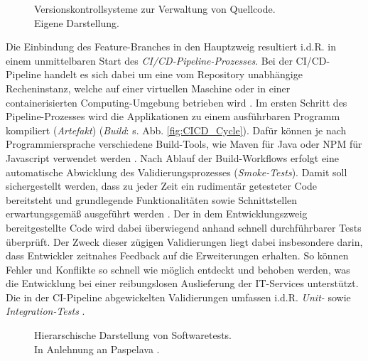 \begin{center}
	\begin{figure}[H]
		\centering
		\caption[Versionskontrollsysteme zur Verwaltung von Quellcode]{Versionskontrollsysteme zur Verwaltung von Quellcode.\\ Eigene Darstellung.}
		\label{fig:VCS}
	\end{figure}
\end{center}
\vspace*{-10mm}
Die Einbindung des Feature-Branches in den Hauptzweig resultiert i.d.R. in einem unmittelbaren Start des \textit{CI/CD-Pipeline-Prozesses}. Bei der CI/CD-Pipeline handelt es sich dabei um eine vom Repository unabhängige Recheninstanz, welche auf einer virtuellen Maschine oder in einer containerisierten Computing-Umgebung betrieben wird \cite[Kap. 1.2]{Labouardy.2021}. Im ersten Schritt des Pipeline-Prozesses wird die Applikationen zu einem ausführbaren Programm kompiliert (\textit{Artefakt}) (\textit{Build}: s. Abb. \ref*{fig:CICD_Cycle}). Dafür können je nach Programmiersprache verschiedene Build-Tools, wie Maven für Java oder NPM für Javascript verwendet werden \cite[Kap. 7.1]{Labouardy.2021}. Nach Ablauf der Build-Workflows erfolgt eine automatische Abwicklung des Validierungsprozesses (\textit{Smoke-Tests}). Damit soll sichergestellt werden, dass zu jeder Zeit ein rudimentär getesteter Code bereitsteht und grundlegende Funktionalitäten sowie Schnittstellen erwartungsgemäß ausgeführt werden \cite[19]{Halstenberg.2020}. Der in dem Entwicklungszweig bereitgestellte Code wird dabei überwiegend anhand schnell durchführbarer Tests überprüft. Der Zweck dieser zügigen Validierungen liegt dabei insbesondere darin, dass Entwickler zeitnahes Feedback auf die Erweiterungen erhalten. So können Fehler und Konflikte so schnell wie möglich entdeckt und behoben werden, was die Entwicklung bei einer reibungslosen Auslieferung der IT-Services unterstützt. Die in der CI-Pipeline abgewickelten Validierungen umfassen i.d.R. \textit{Unit-} sowie \textit{Integration-Tests} \cite[Kap. 1.2]{Labouardy.2021}.
\begin{center}
	\begin{figure}[H]
		\centering
		\caption[Hierarschische Darstellung von Softwaretests]{Hierarschische Darstellung von Softwaretests.\\ \hspace{0.5cm}In Anlehnung an Paspelava \cite{Exposit.2021}.}
		\label{fig:Tests}
	\end{figure}
\end{center}
